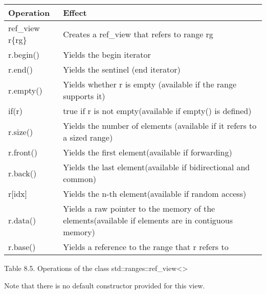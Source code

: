 \begin{longtable}[c]{|l|l|}
	\hline
	\textbf{Operation} & \textbf{Effect}                                                \\ \hline
	\endfirsthead
	\endhead
	ref\_view r\{rg\}  & Creates a ref\_view that refers to range rg                    \\ \hline
	r.begin()          & Yields the begin iterator                                      \\ \hline
	r.end()            & Yields the sentinel (end iterator)                             \\ \hline
	r.empty()          & Yields whether r is empty (available if the range supports it) \\ \hline
	if(r)              & true if r is not empty(available if empty() is defined)        \\ \hline
	r.size() & Yields the number of elements (available if it refers to a sized range)                            \\ \hline
	r.front()          & Yields the first element(available if forwarding)              \\ \hline
	r.back()           & Yields the last element(available if bidirectional and common) \\ \hline
	r{[}idx{]}         & Yields the n-th element(available if random access)            \\ \hline
	r.data() & Yields a raw pointer to the memory of the elements(available if elements are in contiguous memory) \\ \hline
	r.base()           & Yields a reference to the range that r refers to               \\ \hline
\end{longtable}

\begin{center}
Table 8.5. Operations of the class std::ranges::ref\_view<>
\end{center}

Note that there is no default constructor provided for this view.


